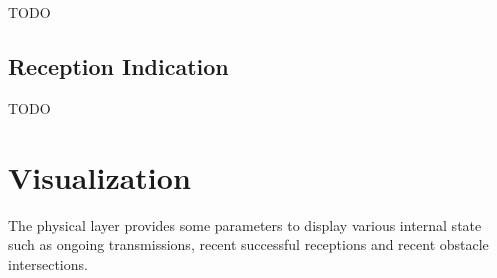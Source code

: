 TODO

\subsection{Reception Indication}

TODO

\section{Visualization}

The physical layer provides some parameters to display various internal state
such as ongoing transmissions, recent successful receptions and recent obstacle
intersections.


